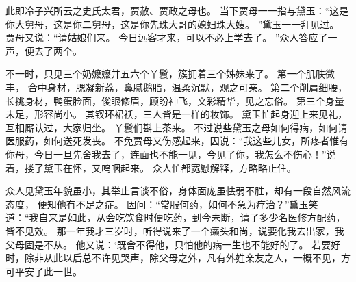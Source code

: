 此即冷子兴所云之史氏太君，贾赦、贾政之母也。
当下贾母一一指与黛玉：“这是你大舅母，这是你二舅母，这是你先珠大哥的媳妇珠大嫂。
”黛玉一一拜见过。
贾母又说：“请姑娘们来。
今日远客才来，可以不必上学去了。
”众人答应了一声，便去了两个。
\par
不一时，只见三个奶嬷嬷并五六个丫鬟，簇拥着三个姊妹来了。
第一个肌肤微丰，
合中身材，腮凝新荔，鼻腻鹅脂，温柔沉默，观之可亲。
第二个削肩细腰，长挑身材，鸭蛋脸面，俊眼修眉，顾盼神飞，文彩精华，见之忘俗。
第三个身量未足，形容尚小。
其钗环裙袄，三人皆是一样的妆饰。
黛玉忙起身迎上来见礼，互相厮认过，大家归坐。
丫鬟们斟上茶来。
不过说些黛玉之母如何得病，如何请医服药，如何送死发丧。
不免贾母又伤感起来，因说：“我这些儿女，所疼者惟有你母，今日一旦先舍我去了，连面也不能一见，今见了你，我怎么不伤心！”说着，搂了黛玉在怀，又呜咽起来。
众人忙都宽慰解释，方略略止住。
\par
众人见黛玉年貌虽小，其举止言谈不俗，身体面庞虽怯弱不胜，却有一段自然风流态度，
便知他有不足之症。
因问：“常服何药，如何不急为疗治？”黛玉笑道：“我自来是如此，从会吃饮食时便吃药，到今未断，请了多少名医修方配药，皆不见效。
那一年我才三岁时，听得说来了一个癞头和尚，说要化我去出家，我父母固是不从。
他又说：‘既舍不得他，只怕他的病一生也不能好的了。
若要好时，除非从此以后总不许见哭声，除父母之外，凡有外姓亲友之人，一概不见，方可平安了此一世。
